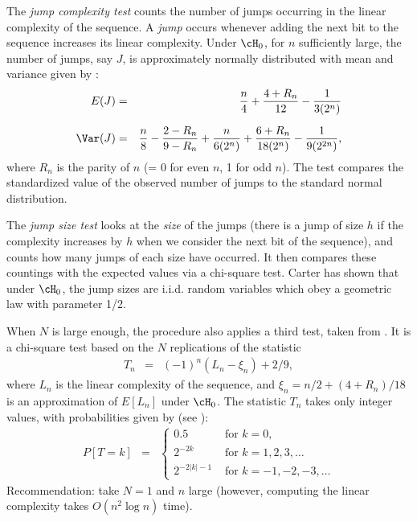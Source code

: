   The {\em jump complexity test\/} counts the number of jumps occurring in the 
  linear complexity of the sequence.  A {\em jump\/} occurs whenever adding 
  the next bit to the sequence increases its linear complexity. 
  Under $\cH_0$, for $n$ sufficiently large, the number of jumps, say $J$,
  is approximately normally distributed  with mean and variance
  given by \cite{rWAN97a}:
  \begin{eqnarray}
      E(J) & = & \frac n 4 + \frac{4 + R_n}{12} - \frac 1 {3(2^n)} \\[6pt]
   \Var(J) & = & \frac n 8 - \frac{2 - R_n}{9 - R_n} + \frac n {6(2^n)}
                 + \frac{6 + R_n}{18(2^n)} - \frac 1 {9(2^{2n})},
   \end{eqnarray}
  where $R_n$ is the parity of $n$ (= 0 for even $n$, 1 for odd $n$).
  The test compares the standardized value of the observed number 
  of jumps to the standard normal distribution.

  The {\em jump size test\/} looks at the
  {\em size\/} of the jumps (there is a jump of size $h$ if the
  complexity increases by $h$ when we consider the next bit of the
  sequence), and counts how many jumps of each size have occurred.
  It then compares these countings with the expected values via a chi-square test.
   Carter has shown \cite{rCAR89a} that under $\cH_0$, the jump sizes are i.i.d.
   random variables which obey a geometric law with parameter 1/2.

  When $N$ is large enough, the procedure also applies a third test,
  taken from \cite{rRUK01a}.  It is a chi-square 
  test based on the $N$ replications of the statistic
  \begin{eqnarray}
   T_n  & = & (-1)^n (L_n - \xi_n) + 2/9,  \nonumber
  \end{eqnarray}
  where $L_n$ is the linear complexity of the sequence, and
  $\xi_n = n/2 + (4 + R_n)/18$ is an approximation of $E[L_n]$ under $\cH_0$.
  The statistic $T_n$ takes only integer values, with probabilities 
  given by (see \cite{rRUK01a}):
   \begin{eqnarray*}
     P[T = k] & = & \left\{\begin{array}{ll} 
          0.5 & \mbox{ for } k=0, \\[4pt]
         \displaystyle {2^{-2k}} & \mbox{ for } k = 1, 2, 3,
    \ldots \\[4pt]
         \displaystyle { 2^{-2|k| - 1}} & \mbox{ for } k = -1, -2,
  -3, \ldots 
       \end{array} \right.
   \end{eqnarray*}
  Recommendation: take $N=1$ and $n$ large (however, computing the 
  linear complexity takes $O(n^2 \log n)$ time).
\endtab
\code


